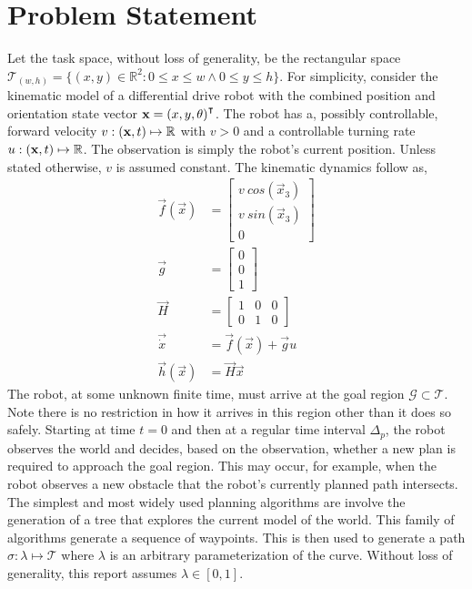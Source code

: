 \documentclass[oneside, 11pt]{book}
\begin{document}
\section{Problem Statement}
Let the task space, without loss of generality, be the rectangular space  $\mathcal{T}_{(w,h)} = \{(x,y)\in\mathbb{R}^2 : 0 \leq x \leq w \wedge 0 \leq y \leq h\}$. For simplicity, consider the kinematic model of a differential drive robot with the combined position and orientation state vector $\mathbf{x}={(x,y,\theta)}^{\intercal}$. The robot has a, possibly controllable, forward velocity $v:(\mathbf{x}, t)\mapsto\mathbb{R}$ with $v>0$ and a controllable turning rate $u:(\mathbf{x}, t)\mapsto\mathbb{R}$. The observation is simply the robot's current position. Unless stated otherwise, $v$ is assumed constant. The kinematic dynamics follow as,
\begin{align}
    \vec{f}(\vec{x}) &=
        \begin{bmatrix}
            v~cos(\vec{x}_3)\\
            v~sin(\vec{x}_3)\\
            0
        \end{bmatrix} \nonumber \\
    \vec{g} &= \begin{bmatrix} 0 \\ 0 \\ 1 \end{bmatrix} \nonumber \\
    \vec{H} &=
        \begin{bmatrix}
            1 & 0 & 0\\
            0 & 1 & 0
        \end{bmatrix} \nonumber \\
    \vec{\dot{x}} &=
        \vec{f}(\vec{x})
        +
        \vec{g} u \nonumber \\
    \vec{h}(\vec{x}) &= \vec{H}\vec{x}
    \label{eqn:basic_kinematic_model}
\end{align}
The robot, at some unknown finite time, must arrive at the goal region $\mathcal{G}\subset\mathcal{T}$. Note there is no restriction in how it arrives in this region other than it does so safely. Starting at time $t=0$ and then at a regular time interval $\Delta_p$, the robot observes the world and decides, based on the observation, whether a new plan is required to approach the goal region. This may occur, for example, when the robot observes a new obstacle that the robot's currently planned path intersects. The simplest and most widely used planning algorithms are involve the generation of a tree that explores the current model of the world. This family of algorithms generate a sequence of waypoints. This is then used to generate a path $\sigma: \lambda \mapsto \mathcal{T}$ where $\lambda$ is an arbitrary parameterization of the curve. Without loss of generality, this report assumes $\lambda\in[0,1]$.
\end{document}
